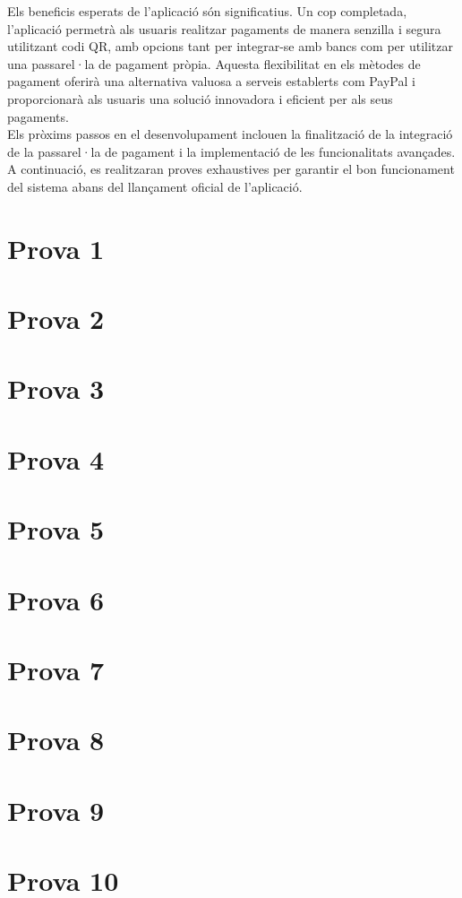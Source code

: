 \documentclass[a4paper,12pt,twoside]{ThesisStyle}
\begin{document}
Els beneficis esperats de l'aplicació són significatius. Un cop completada, l'aplicació permetrà als usuaris realitzar pagaments de manera senzilla i segura utilitzant codi QR, amb opcions tant per integrar-se amb bancs com per utilitzar una passarel·la de pagament pròpia. Aquesta flexibilitat en els mètodes de pagament oferirà una alternativa valuosa a serveis establerts com PayPal i proporcionarà als usuaris una solució innovadora i eficient per als seus pagaments.\\

Els pròxims passos en el desenvolupament inclouen la finalització de la integració de la passarel·la de pagament i la implementació de les funcionalitats avançades. A continuació, es realitzaran proves exhaustives per garantir el bon funcionament del sistema abans del llançament oficial de l'aplicació.



\section{Prova 1}
\section{Prova 2}
\section{Prova 3}
\section{Prova 4}
\section{Prova 5}
\section{Prova 6}
\section{Prova 7}
\section{Prova 8}
\section{Prova 9}
\section{Prova 10}
\end{document}
